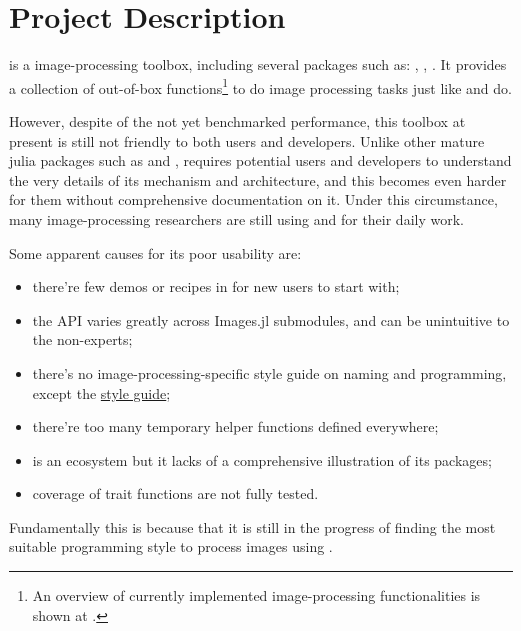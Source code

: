 
\section{Project Description}\label{sec:project}

\repoimages{} is a \langjulia image-processing toolbox, including several packages such as: \repoimagecore, \repoimagetransformations, \repoimageaxes. It provides a collection of out-of-box functions\footnote{An overview of currently implemented image-processing functionalities is shown at \apicomparison.} to do image processing tasks just like \reposcikitimage{} and \matlabimageprocessing{} do.

However, despite of the not yet benchmarked performance, this toolbox at present is still not friendly to both users and developers. Unlike other mature julia packages such as \repojump and \repogpuarrays, \images{} requires potential users and developers to understand the very details of its mechanism and architecture, and this becomes even harder for them without comprehensive documentation on it. Under this circumstance, many image-processing researchers are still using \langpython and \langmatlab for their daily work.

Some apparent causes for its poor usability are:
\begin{itemize}
    \item there're few demos or recipes in \images{} for new users to start with;
    \item the API varies greatly across Images.jl submodules, and can be unintuitive to the non-experts;
    \item there's no image-processing-specific style guide on naming and programming, except the \langjulia{} \href{https://docs.julialang.org/en/v1/manual/style-guide/}{style guide};
    \item there're too many temporary helper functions defined everywhere;
    \item \images{} is an ecosystem but it lacks of a comprehensive illustration of its packages;
    \item coverage of trait functions are not fully tested.
\end{itemize}
Fundamentally this is because that it is still in the progress of finding the most suitable programming style to process images using \langjulia.

